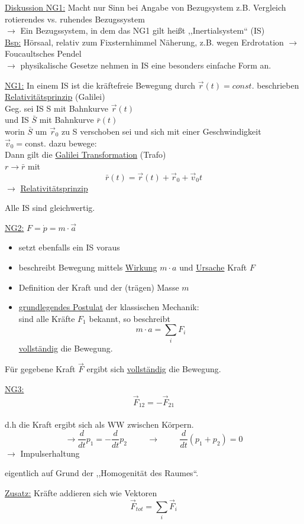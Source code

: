 \documentclass[titlepage,12pt,a4paper,ngerman]{report}
\newcommand{\tx}[1]{\textrm{#1}}
\newcommand{\const}{\tx{const.}}
\begin{document}
{\large\underline{Diskussion
	{NG1:}} Macht nur Sinn bei Angabe von Bezugsystem z.B. Vergleich rotierendes vs. ruhendes Bezugssystem\\
$\rightarrow$ Ein Bezugssystem, in dem das NG1 gilt heißt ,,Inertialsystem`` (IS)\\
\underline{Bsp:} Hörsaal, relativ zum Fixsternhimmel
Näherung, z.B. wegen Erdrotation $\rightarrow$ Foucaultsches Pendel\\
$\rightarrow$ physikalische Gesetze nehmen in IS eine besonders einfache Form an.\par
\underline{NG1:} In einem IS ist die kräftefreie Bewegung durch $\vec{r}(t) = const.$ beschrieben
\underline{Relativitätsprinzip} (Galilei)\\
Geg. sei IS S mit Bahnkurve $\vec{r}(t)$\\
und IS $\bar{S}$ mit Bahnkurve $\bar{r}(t)$\\
worin $\bar{S}$ um $\vec{r}_{0}$ zu S verschoben sei und sich mit einer Geschwindigkeit $\vec{v}_{0} = \const$ dazu bewege:\\
Dann gilt die \underline{Galilei Transformation} (Trafo)\\
$ r \rightarrow \bar{r}$ mit
\begin{equation*}
\bar{r} (t) = \vec{r}(t) + \vec{r}_{0} + \vec{v}_{0} t \tag{1}
\end{equation*}
$\rightarrow$ \underline{Relativitätsprinzip}\par
Alle IS sind gleichwertig.\par
{\large\underline{NG2:}} $F = \dot{p} = m \cdot \vec{a}$ %
\begin{itemize}
	\item setzt ebenfalls ein IS voraus
	\item beschreibt Bewegung mittels \underline{Wirkung} $m\cdot a$ und \underline{Ursache} Kraft $F$
	\item Definition der Kraft und der (trägen) Masse $m$
	\item \underline{grundlegendes Postulat} der klassischen Mechanik:\\
	sind alle Kräfte $F_{1}$ bekannt, so beschreibt $$m\cdot a = \sum_{i} F_{i}$$ \underline{vollständig} die Bewegung.
\end{itemize}
Für gegebene Kraft $\vec{F}$ ergibt sich \underline{vollständig} die Bewegung.\par
\underline{NG3:} $$\vec{F}_{12}=-\vec{F}_{21}$$\\
d.h die Kraft ergibt sich als WW zwischen Körpern.\\
$$\rightarrow \frac{d}{dt} p_{1}=-\frac{d}{dt}p_{2} \hspace{1cm} \rightarrow \hspace{1cm} \frac{d}{dt}(p_{1}+p_{2}) =0$$
$\rightarrow$ Impulserhaltung\par
eigentlich auf Grund der ,,Homogenität des Raumes``.\par
\underline{Zusatz:} Kräfte addieren sich wie Vektoren\\
$$ \vec{F}_{tot} = \sum_{i} \vec{F}_{i}$$
}
\end{document}
